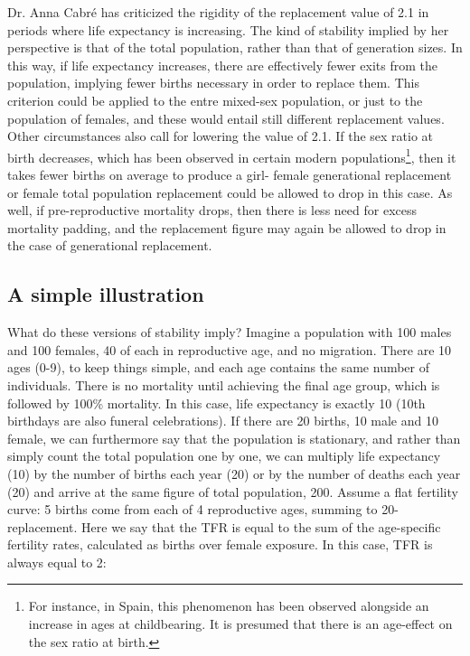 \documentclass[reqno,12pt,oneside,a4paper]{report} %
\theoremstyle{plain}
\theoremstyle{definition}
\theoremstyle{remark}
\numberwithin{theorem}{chapter}     %
\begin{document}
Dr. Anna Cabr\'{e} has criticized the rigidity of the replacement value of 2.1 in periods where life expectancy is increasing. The kind of stability implied by her perspective is that of the total population, rather than that of generation sizes. In this way, if life expectancy increases, there are effectively fewer exits from the population, implying fewer births necessary in order to replace them. This criterion could be applied to the entre mixed-sex population, or just to the population of females, and these would entail still different replacement values. Other circumstances also call for lowering the value of 2.1. If the sex ratio at birth decreases, which has been observed in certain modern populations\footnote{For instance, in Spain, this phenomenon has been observed alongside an increase in ages at childbearing. It is presumed that there is an age-effect on the sex ratio at birth.}, then it takes fewer births on average to produce a girl- female generational replacement or female total population replacement could be allowed to drop in this case. As well, if pre-reproductive mortality drops, then there is less need for excess mortality padding, and the replacement figure may again be allowed to drop in the case of generational replacement.

	\subsection{A simple illustration}

What do these versions of stability imply? Imagine a population with 100 males and 100 females, 40 of each in reproductive age, and no migration. There are 10 ages (0-9), to keep things simple, and each age contains the same number of individuals. There is no mortality until achieving the final age group, which is followed by 100\% mortality. In this case, life expectancy is exactly 10 (10th birthdays are also funeral celebrations). If there are 20 births, 10 male and 10 female, we can furthermore say that the population is stationary, and rather than simply count the total population one by one, we can multiply life expectancy (10) by the number of births each year (20) or by the number of deaths each year (20) and arrive at the same figure of total population, 200. Assume a flat fertility curve: 5 births come from each of 4 reproductive ages, summing to 20- replacement. Here we say that the TFR is equal to the sum of the age-specific fertility rates, calculated as births over female exposure. In this case, TFR is always equal to 2:
\end{document}
